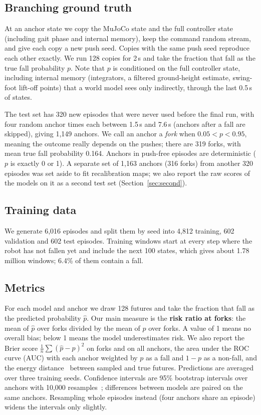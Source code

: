 \documentclass[conference]{IEEEtran}
\begin{document}
\subsection{Branching ground truth}
\label{sec:branch}
At an anchor state we copy the MuJoCo state and the full controller state (including gait
phase and internal memory), keep the command random stream, and give each copy a new push
seed. Copies with the same push seed reproduce each other exactly. We run 128 copies for
2\,s and take the fraction that fall as the true fall probability $p$. Note that $p$ is
conditioned on the full controller state, including internal memory (integrators, a
filtered ground-height estimate, swing-foot lift-off points) that a world model sees only
indirectly, through the last 0.5\,s of states.

The test set has 320 new episodes that were never used before the final run, with four
random anchor times each between 1.5\,s and 7.6\,s (anchors after a fall are skipped),
giving 1,149 anchors. We call an anchor a \emph{fork} when $0.05 < p < 0.95$, meaning the
outcome really depends on the pushes; there are 319 forks, with mean true fall probability
0.164. Anchors in push-free episodes are deterministic ($p$ is exactly 0 or 1). A separate
set of 1,163 anchors (316 forks) from another 320 episodes was set aside to fit
recalibration maps; we also report the raw scores of the models on it as a second test set
(Section~\ref{sec:second}).

\subsection{Training data}
We generate 6,016 episodes and split them by seed into 4,812 training, 602 validation and
602 test episodes. Training windows start at every step where the robot has not fallen yet
and include the next 100 states, which gives about 1.78 million windows; 6.4\% of them
contain a fall.

\subsection{Metrics}
For each model and anchor we draw 128 futures and take the fraction that fall as the
predicted probability $\hat p$. Our main measure is the \textbf{risk ratio at forks}: the
mean of $\hat p$ over forks divided by the mean of $p$ over forks. A value of 1 means no
overall bias; below 1 means the model underestimates risk. We also report the Brier score
$\frac{1}{n}\sum(\hat p - p)^2$ on forks and on all anchors, the area under the ROC curve
(AUC) with each anchor weighted by $p$ as a fall and $1-p$ as a non-fall, and the energy
distance~\cite{szekely2013energy} between sampled and true futures. Predictions are
averaged over three training seeds. Confidence intervals are 95\% bootstrap intervals over
anchors with 10,000 resamples~\cite{efron1994bootstrap}; differences between models are
paired on the same anchors. Resampling whole episodes instead (four anchors share an
episode) widens the intervals only slightly.
\end{document}
